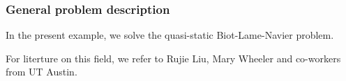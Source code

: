 \subsubsection{General problem description}

In the present example, we solve the quasi-static 
Biot-Lame-Navier problem. 

For literture on this field, we refer to 
Rujie Liu, Mary Wheeler and co-workers from UT Austin.
